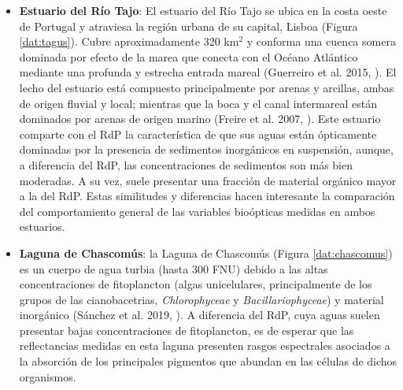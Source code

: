     \begin{itemize}
    \item \textbf{Estuario del Río Tajo}: El estuario del Río Tajo se ubica en la costa oeste de Portugal y atraviesa la región urbana de su capital, Lisboa (Figura \ref{dat:tagus}). Cubre aproximadamente 320 km$^{2}$ y conforma una cuenca somera dominada por efecto de la marea que conecta con el Océano Atlántico mediante una profunda y estrecha entrada mareal (Guerreiro et al. 2015, \cite{guerreiro2015}). El lecho del estuario está compuesto principalmente por arenas y arcillas, ambas de origen fluvial y local; mientras que la boca y el canal intermareal están dominados por arenas de origen marino (Freire et al. 2007, \cite{freire2007}). Este estuario comparte con el RdP la característica de que sus aguas están ópticamente dominadas por la presencia de sedimentos inorgánicos en suspensión, aunque, a diferencia del RdP, las concentraciones de sedimentos son más bien moderadas. A su vez, suele presentar una fracción de material orgánico mayor a la del RdP. Estas similitudes y diferencias hacen interesante la comparación del comportamiento general de las variables bioópticas medidas en ambos estuarios.
    \item \textbf{Laguna de Chascomús}: la Laguna de Chascomús (Figura \ref{dat:chascomus}) es un cuerpo de agua turbia (hasta 300 FNU) debido a las altas concentraciones de fitoplancton (algas unicelulares, principalmente de los grupos de las cianobacetrias, \textit{Chlorophyceae} y \textit{Bacillariophyceae}) y material inorgánico (Sánchez et al. 2019, \cite{sanchez2018}). A diferencia del RdP, cuya aguas suelen presentar bajas concentraciones de fitoplancton, es de esperar que las reflectancias medidas en esta laguna presenten rasgos espectrales asociados a la absorción de los principales pigmentos que abundan en las células de dichos organismos.
    \end{itemize}
    
